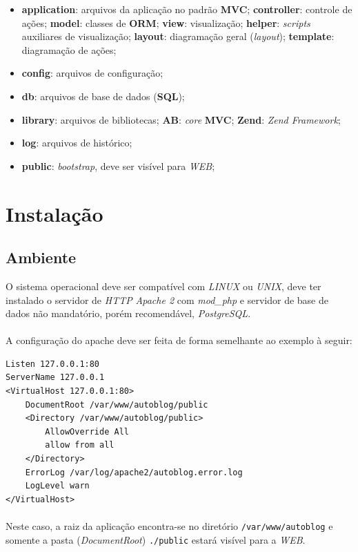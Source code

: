 \documentclass[a4paper,12pt]{article}
\begin{document}
\begin{itemize}
\item \textbf{application}: arquivos da aplicação no padrão \textbf{MVC};
\subitem \textbf{controller}: controle de ações;
\subitem \textbf{model}: classes de \textbf{ORM};
\subitem \textbf{view}: visualização;
\subsubitem \textbf{helper}: \emph{scripts} auxiliares de visualização;
\subsubitem \textbf{layout}: diagramação geral (\emph{layout});
\subsubitem \textbf{template}: diagramação de ações;
\item \textbf{config}: arquivos de configuração;
\item \textbf{db}: arquivos de base de dados (\textbf{SQL});
\item \textbf{library}: arquivos de bibliotecas;
\subitem \textbf{AB}: \emph{core} \textbf{MVC};
\subitem \textbf{Zend}: \emph{Zend Framework};
\item \textbf{log}: arquivos de histórico;
\item \textbf{public}: \emph{bootstrap}, deve ser visível para \emph{WEB};
\end{itemize}


\section{Instalação}

\subsection{Ambiente}
O sistema operacional deve ser compatível com \emph{LINUX} ou \emph{UNIX}, deve ter instalado o servidor de \emph{HTTP} \emph{Apache 2} com \emph{mod\_php} e servidor de base de dados não mandatório, porém recomendável, \emph{PostgreSQL}.

\paragraph{}
A configuração do apache deve ser feita de forma semelhante ao exemplo à seguir:

\begin{verbatim}
Listen 127.0.0.1:80
ServerName 127.0.0.1
<VirtualHost 127.0.0.1:80>
    DocumentRoot /var/www/autoblog/public
    <Directory /var/www/autoblog/public>
        AllowOverride All
        allow from all
    </Directory>
    ErrorLog /var/log/apache2/autoblog.error.log
    LogLevel warn
</VirtualHost>
\end{verbatim}

\paragraph{}
Neste caso, a raiz da aplicação encontra-se no diretório \texttt{/var/www/autoblog} e somente a pasta (\emph{DocumentRoot}) \texttt{./public} estará visível para a \emph{WEB}.
\end{document}

